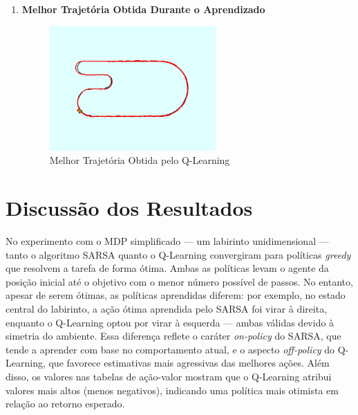 \documentclass[a4paper,12pt]{article}
\begin{document}
\begin{enumerate}[label=2.2.\arabic*.]
\begin{figure}[h!]
\begin{minipage}{0.5\textwidth}
      \end{minipage}
    \end{figure}
    
    \item \textbf{Melhor Trajetória Obtida Durante o Aprendizado}\\
    \begin{figure}[!h]
    \centering
    \includegraphics[width=0.6\textwidth]{q-learning/line_follower_solution.jpeg}
    \caption{Melhor Trajetória Obtida pelo Q-Learning}
    \end{figure}
\end{enumerate}


\newpage
\section{Discussão dos Resultados}

No experimento com o MDP simplificado — um labirinto unidimensional — tanto o algoritmo SARSA quanto o Q-Learning convergiram para políticas \textit{greedy} que resolvem a tarefa de forma ótima. Ambas as políticas levam o agente da posição inicial até o objetivo com o menor número possível de passos. No entanto, apesar de serem ótimas, as políticas aprendidas diferem: por exemplo, no estado central do labirinto, a ação ótima aprendida pelo SARSA foi virar à direita, enquanto o Q-Learning optou por virar à esquerda — ambas válidas devido à simetria do ambiente. Essa diferença reflete o caráter \textit{on-policy} do SARSA, que tende a aprender com base no comportamento atual, e o aspecto \textit{off-policy} do Q-Learning, que favorece estimativas mais agressivas das melhores ações. Além disso, os valores nas tabelas de ação-valor mostram que o Q-Learning atribui valores mais altos (menos negativos), indicando uma política mais otimista em relação ao retorno esperado.
\end{document}
